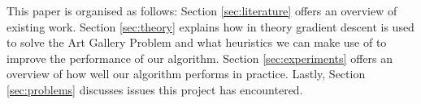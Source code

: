 This paper is organised as follows: Section \ref{sec:literature} offers an overview of existing work. Section \ref{sec:theory} explains how in theory gradient descent is used to solve the Art Gallery Problem and what heuristics we can make use of to improve the performance of our algorithm. Section \ref{sec:experiments} offers an overview of how well our algorithm performs in practice. Lastly, Section \ref{sec:problems} discusses issues this project has encountered.
